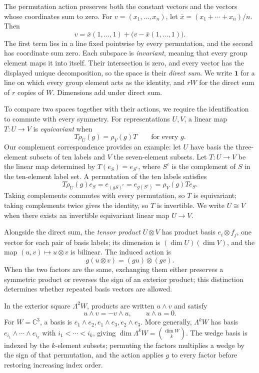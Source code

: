 \documentclass[11pt,a4paper]{article}
\begin{document}
The permutation action preserves both the constant vectors and the vectors whose coordinates sum to zero. For \(v=(x_1,\ldots,x_n)\), let \(\bar x=(x_1+\cdots+x_n)/n\). Then
\[
v=\bar x(1,\ldots,1)
   +\bigl(v-\bar x(1,\ldots,1)\bigr).
\]
The first term lies in a line fixed pointwise by every permutation, and the second has coordinate sum zero. Each subspace is \emph{invariant}, meaning that every group element maps it into itself. Their intersection is zero, and every vector has the displayed unique decomposition, so the space is their \emph{direct sum}. We write \(\mathbf1\) for a line on which every group element acts as the identity, and \(rW\) for the direct sum of \(r\) copies of \(W\). Dimensions add under direct sum.

To compare two spaces together with their actions, we require the identification to commute with every symmetry. For representations \(U,V\), a linear map \(T:U\to V\) is \emph{equivariant} when
\[
T\rho_U(g)=\rho_V(g)T\qquad\text{for every }g.
\]
Our complement correspondence provides an example: let \(U\) have basis the three-element subsets of ten labels and \(V\) the seven-element subsets. Let \(T:U\to V\) be the linear map determined by \(T(e_S)=e_{S^c}\), where \(S^c\) is the complement of \(S\) in the ten-element label set. A permutation of the ten labels satisfies
\[
T\rho_U(g)e_S=e_{(gS)^c}=e_{g(S^c)}=\rho_V(g)Te_S.
\]
Taking complements commutes with every permutation, so \(T\) is equivariant; taking complements twice gives the identity, so \(T\) is invertible. We write \(U\cong V\) when there exists an invertible equivariant linear map \(U\to V\).

Alongside the direct sum, the \emph{tensor product} \(U\otimes V\) has product basis \(e_i\otimes f_j\), one vector for each pair of basis labels; its dimension is \((\dim U)(\dim V)\), and the map \((u,v)\mapsto u\otimes v\) is bilinear. The induced action is
\[
g(u\otimes v)=(gu)\otimes(gv).
\]
When the two factors are the same, exchanging them either preserves a symmetric product or reverses the sign of an exterior product; this distinction determines whether repeated basis vectors are allowed.

In the exterior square \(\Lambda^2W\), products are written \(u\wedge v\) and satisfy
\[
u\wedge v=-v\wedge u,\qquad u\wedge u=0.
\]
For \(W=\mathbb C^3\), a basis is \(e_1\wedge e_2,e_1\wedge e_3,e_2\wedge e_3\). More generally, \(\Lambda^kW\) has basis \(e_{i_1}\wedge\cdots\wedge e_{i_k}\) with \(i_1<\cdots<i_k\), giving \(\dim\Lambda^kW=\binom{\dim W}{k}\). The wedge basis is indexed by the \(k\)-element subsets; permuting the factors multiplies a wedge by the sign of that permutation, and the action applies \(g\) to every factor before restoring increasing index order.
\end{document}
